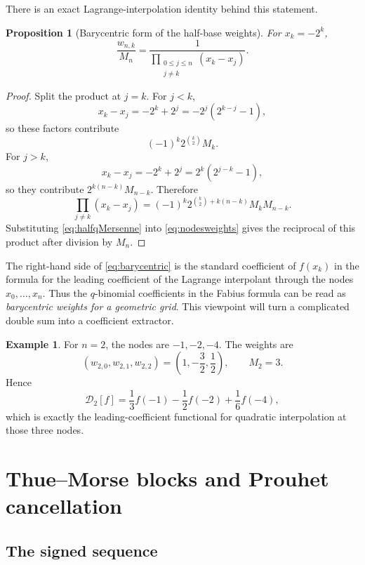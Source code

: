 \documentclass[11pt,oneside]{article}
\newtheorem{proposition}[theorem]{Proposition}
\theoremstyle{definition}
\newtheorem{example}[theorem]{Example}
\theoremstyle{remark}
\begin{document}
There is an exact Lagrange-interpolation identity behind this statement.

\begin{proposition}[Barycentric form of the half-base weights]\label{prop:barycentric}
For $x_k=-2^k$,
\begin{equation}\label{eq:barycentric}
 \boxed{
 \frac{w_{n,k}}{M_n}
 =\frac{1}{\displaystyle\prod_{\substack{0\le j\le n\\j\ne k}}(x_k-x_j)}.}
\end{equation}
\end{proposition}

\begin{proof}
Split the product at $j=k$.  For $j<k$,
\[
 x_k-x_j=-2^k+2^j=-2^j(2^{k-j}-1),
\]
so these factors contribute
\[
 (-1)^k2^{\binom{k}{2}}M_k.
\]
For $j>k$,
\[
 x_k-x_j=-2^k+2^j=2^k(2^{j-k}-1),
\]
so they contribute $2^{k(n-k)}M_{n-k}$.  Therefore
\[
 \prod_{j\ne k}(x_k-x_j)
 =(-1)^k2^{\binom{k}{2}+k(n-k)}M_kM_{n-k}.
\]
Substituting \eqref{eq:halfqMersenne} into \eqref{eq:nodesweights} gives the reciprocal of this product after division by $M_n$.
\end{proof}

The right-hand side of \eqref{eq:barycentric} is the standard coefficient of $f(x_k)$ in the formula for the leading coefficient of the Lagrange interpolant through the nodes $x_0,\ldots,x_n$.  Thus the $q$-binomial coefficients in the Fabius formula can be read as \emph{barycentric weights for a geometric grid}.  This viewpoint will turn a complicated double sum into a coefficient extractor.

\begin{example}
For $n=2$, the nodes are $-1,-2,-4$.  The weights are
\[
 (w_{2,0},w_{2,1},w_{2,2})=\left(1,-\frac32,\frac12\right),
 \qquad M_2=3.
\]
Hence
\[
 \mathcal D_2[f]
 =\frac13f(-1)-\frac12f(-2)+\frac16f(-4),
\]
which is exactly the leading-coefficient functional for quadratic interpolation at those three nodes.
\end{example}

\section{Thue--Morse blocks and Prouhet cancellation}

\subsection{The signed sequence}
\end{document}
